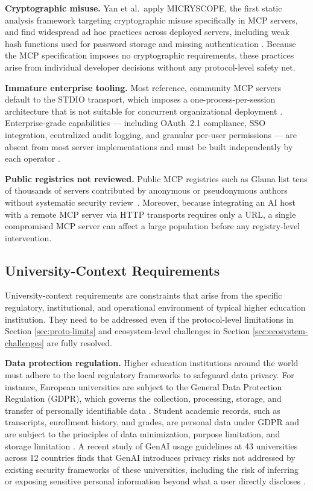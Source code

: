 \documentclass[english, 12pt, a4paper, elec, utf8, a-2b, online]{aaltothesis}
\begin{document}
\textbf{Cryptographic misuse.}
Yan et al.\ apply MICRYSCOPE, the first static analysis framework targeting cryptographic misuse specifically in MCP servers, and find widespread ad hoc practices across deployed servers, including weak hash functions used for password storage and missing authentication \cite{yan2025mcpmisuse}.
Because the MCP specification imposes no cryptographic requirements, these practices arise from individual developer decisions without any protocol-level safety net.

\textbf{Immature enterprise tooling.}
Most reference, community MCP servers default to the STDIO transport, which imposes a one-process-per-session architecture that is not suitable for concurrent organizational deployment \cite{descope2025enterprise}.
Enterprise-grade capabilities --- including OAuth~2.1 compliance, SSO integration, centralized audit logging, and granular
per-user permissions --- are absent from most server implementations and must be built independently by each operator \cite{narajala2025enterprise}.

\textbf{Public registries not reviewed.}
Public MCP registries such as Glama list tens of thousands of servers contributed by anonymous or pseudonymous authors without
systematic security review~\cite{glama_mcp_servers_2026}.
Moreover, because integrating an AI host with a remote MCP server via HTTP transports requires only a URL, a single compromised MCP server can affect a large population before any registry-level intervention. 

\subsection{University-Context Requirements}
\label{sec:university-context}

University-context requirements are constraints that arise from the specific regulatory, institutional, and operational environment of typical higher education institution.
They need to be addressed even if the protocol-level limitations in Section \ref{sec:proto-limits} and ecosystem-level challenges in Section \ref{sec:ecosystem-challenges} are fully resolved.

\textbf{Data protection regulation.}
Higher education institutions around the world must adhere to the local regulatory frameworks to safeguard data privacy.
For instance, European universities are subject to the General Data Protection Regulation (GDPR), which governs the collection, processing, storage, and transfer of personally identifiable data \cite{gdpr2016}.
Student academic records, such as transcripts, enrollment history, and grades, are personal data under GDPR and are subject to the principles of data minimization, purpose limitation, and storage limitation \cite{ng2025security}.
A recent study of GenAI usage guidelines at 43 universities across 12 countries finds that GenAI introduces privacy risks not addressed by existing security frameworks of these universities, including the risk of inferring or
exposing sensitive personal information beyond what a user directly discloses \cite{ng2025security}.
\end{document}
